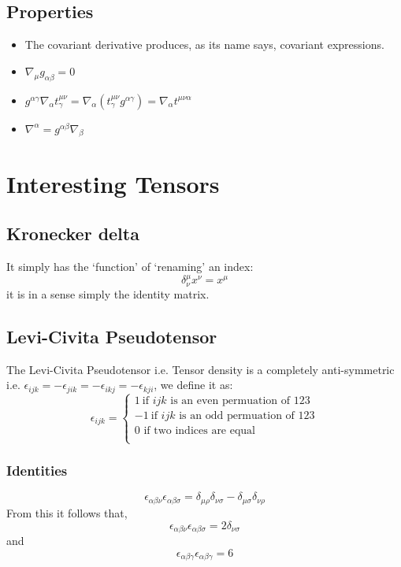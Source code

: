 \subsection{Properties}
\begin{itemize}
\item The covariant derivative produces, as its name says, covariant expressions.
\item $\nabla_{\mu} g_{\alpha \beta} = 0$
\item $g^{\alpha \gamma} \nabla_{\alpha}t^{\mu \nu}_{\gamma} = \nabla_{\alpha}(t^{\mu \nu}_{\gamma}g^{\alpha \gamma}) = \nabla_{\alpha}t^{\mu \nu \alpha}$
\item $\nabla^{\alpha} = g^{\alpha \beta}\nabla_{\beta}$
\end{itemize}
\section{Interesting Tensors}
\subsection{Kronecker delta}
It simply has the ‘function’ of ‘renaming’ an index:
$$\delta^{\mu}_{\nu} x^{\nu} = x^{\mu}$$
it is in a sense simply the identity matrix.
\subsection{Levi-Civita Pseudotensor}
\label{Levi}
The Levi-Civita Pseudotensor i.e. Tensor density is a completely anti-symmetric i.e. $\epsilon_{ijk} = -\epsilon_{jik} = -\epsilon_{ikj} = -\epsilon_{kji}$, we define it as:
\begin{equation}
\epsilon_{ijk} = \begin{cases}
1 \ \text{if } ijk \text{ is an even permuation of } 123\\
-1 \ \text{if } ijk \text{ is an odd permuation of } 123\\
0  \text{ if two indices are equal}\\
\end{cases}
\end{equation}
\subsubsection{Identities}
\begin{equation}
\epsilon_{\alpha \beta \nu}\epsilon_{\alpha \beta \sigma} = \delta_{\mu \rho} \delta_{\nu \sigma} - \delta_{\mu \sigma}\delta_{\nu \rho}
\end{equation}
From this it follows that,
\begin{equation}
\epsilon_{\alpha \beta \nu}\epsilon_{\alpha \beta \sigma} = 2\delta_{\nu \sigma}
\end{equation}
and
\begin{equation}
\epsilon_{\alpha \beta \gamma}\epsilon_{\alpha \beta \gamma} = 6
\end{equation}
